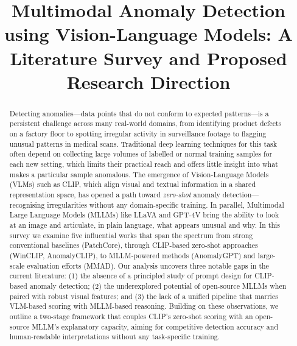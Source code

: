 \documentclass[conference]{IEEEtran}
\begin{document}
\title{Multimodal Anomaly Detection using Vision-Language Models: A Literature Survey and Proposed Research Direction}

\author{
\and
{}
}

\maketitle

\begin{abstract}
Detecting anomalies---data points that do not conform to expected patterns---is a persistent challenge across many real-world domains, from identifying product defects on a factory floor to spotting irregular activity in surveillance footage to flagging unusual patterns in medical scans. Traditional deep learning techniques for this task often depend on collecting large volumes of labelled or normal training samples for each new setting, which limits their practical reach and offers little insight into what makes a particular sample anomalous. The emergence of Vision-Language Models (VLMs) such as CLIP, which align visual and textual information in a shared representation space, has opened a path toward \textit{zero-shot} anomaly detection---recognising irregularities without any domain-specific training. In parallel, Multimodal Large Language Models (MLLMs) like LLaVA and GPT-4V bring the ability to look at an image and articulate, in plain language, what appears unusual and why. In this survey we examine five influential works that span the spectrum from strong conventional baselines (PatchCore), through CLIP-based zero-shot approaches (WinCLIP, AnomalyCLIP), to MLLM-powered methods (AnomalyGPT) and large-scale evaluation efforts (MMAD). Our analysis uncovers three notable gaps in the current literature: (1) the absence of a principled study of prompt design for CLIP-based anomaly detection; (2) the underexplored potential of open-source MLLMs when paired with robust visual features; and (3) the lack of a unified pipeline that marries VLM-based scoring with MLLM-based reasoning. Building on these observations, we outline a two-stage framework that couples CLIP's zero-shot scoring with an open-source MLLM's explanatory capacity, aiming for competitive detection accuracy and human-readable interpretations without any task-specific training.
\end{abstract}
\end{document}
